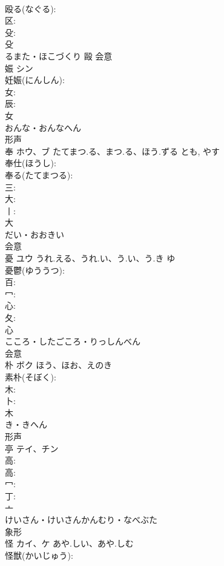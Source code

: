 \documentclass[8pt]{extreport}
\begin{document}
\begin{CJK}{UTF8}{min}
\\	殴る(なぐる): 
\\	区: 
\\	殳: 
\\	殳	
\\	るまた・ほこづくり	毆	会意 
\\	娠	シン			
\\	妊娠(にんしん): 
\\	女: 
\\	辰: 
\\	女	
\\	おんな・おんなへん	
\\	形声 
\\	奉	ホウ、ブ	たてまつ.る、まつ.る、ほう.ずる	とも, やす	
\\	奉仕(ほうし): 
\\	奉る(たてまつる): 
\\	三: 
\\	大: 
\\	丨: 
\\	大	
\\	だい・おおきい	
\\	会意 
\\	憂	ユウ	うれ.える、うれ.い、う.い、う.き	ゆ	
\\	憂鬱(ゆううつ): 
\\	百: 
\\	冖: 
\\	心: 
\\	夂: 
\\	心	
\\	こころ・したごころ・りっしんべん	
\\	会意 
\\	朴	ボク	ほう、ほお、えのき		
\\	素朴(そぼく): 
\\	木: 
\\	卜: 
\\	木	
\\	き・きへん	
\\	形声 
\\	亭	テイ、チン			
\\	高: 
\\	高: 
\\	冖: 
\\	丁: 
\\	亠	
\\	けいさん・けいさんかんむり・なべぶた	
\\	象形 
\\	怪	カイ、ケ	あや.しい、あや.しむ		
\\	怪獣(かいじゅう): 

\end{CJK}
\end{document}
